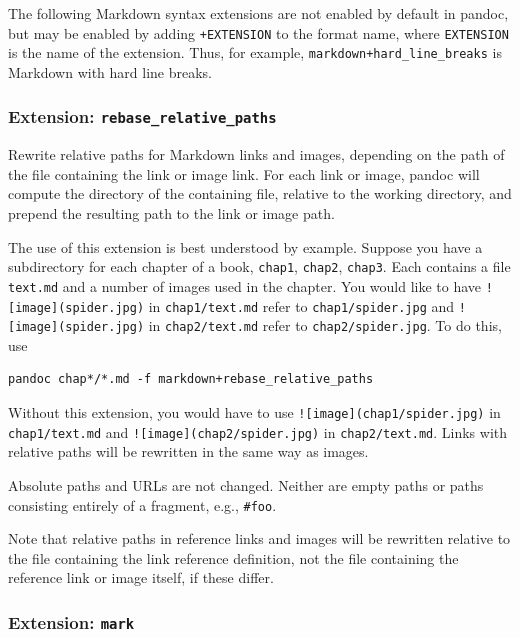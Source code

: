 \documentclass[
]{article}
\begin{document}
The following Markdown syntax extensions are not enabled by default in
pandoc, but may be enabled by adding \texttt{+EXTENSION} to the format
name, where \texttt{EXTENSION} is the name of the extension. Thus, for
example, \texttt{markdown+hard\_line\_breaks} is Markdown with hard line
breaks.

\hypertarget{extension-rebase_relative_paths}{%
\subsubsection{\texorpdfstring{Extension:
\texttt{rebase\_relative\_paths}}{Extension: rebase\_relative\_paths}}\label{extension-rebase_relative_paths}}

Rewrite relative paths for Markdown links and images, depending on the
path of the file containing the link or image link. For each link or
image, pandoc will compute the directory of the containing file,
relative to the working directory, and prepend the resulting path to the
link or image path.

The use of this extension is best understood by example. Suppose you
have a subdirectory for each chapter of a book, \texttt{chap1},
\texttt{chap2}, \texttt{chap3}. Each contains a file \texttt{text.md}
and a number of images used in the chapter. You would like to have
\texttt{!{[}image{]}(spider.jpg)} in \texttt{chap1/text.md} refer to
\texttt{chap1/spider.jpg} and \texttt{!{[}image{]}(spider.jpg)} in
\texttt{chap2/text.md} refer to \texttt{chap2/spider.jpg}. To do this,
use

\begin{verbatim}
pandoc chap*/*.md -f markdown+rebase_relative_paths
\end{verbatim}

Without this extension, you would have to use
\texttt{!{[}image{]}(chap1/spider.jpg)} in \texttt{chap1/text.md} and
\texttt{!{[}image{]}(chap2/spider.jpg)} in \texttt{chap2/text.md}. Links
with relative paths will be rewritten in the same way as images.

Absolute paths and URLs are not changed. Neither are empty paths or
paths consisting entirely of a fragment, e.g., \texttt{\#foo}.

Note that relative paths in reference links and images will be rewritten
relative to the file containing the link reference definition, not the
file containing the reference link or image itself, if these differ.

\hypertarget{extension-mark}{%
\subsubsection{\texorpdfstring{Extension:
\texttt{mark}}{Extension: mark}}\label{extension-mark}}
\end{document}
